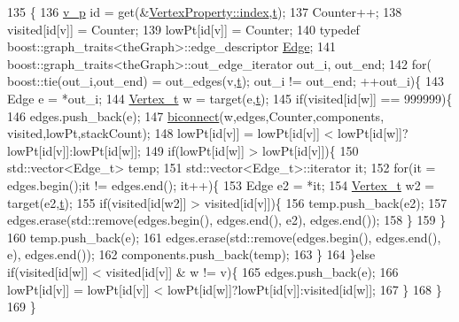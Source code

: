 \begin{DoxyCode}
135                                   \{
136     \hyperlink{utilities_8h_a3f4959b3d837fa6351a9414c79280286}{v\_p} \textcolor{keywordtype}{id} = \textcolor{keyword}{get}(&\hyperlink{struct_utility_structs_1_1_vertex_property_a636cb729438e999aa3d9a17ac39d8641}{VertexProperty::index},\hyperlink{class_tarjan_a54b0703f885a3514ea0bf4cdbc7fdaad}{t});
137     Counter++;
138     visited[\textcolor{keywordtype}{id}[v]] = Counter;
139     lowPt[\textcolor{keywordtype}{id}[v]] = Counter;
140     \textcolor{keyword}{typedef} boost::graph\_traits<theGraph>::edge\_descriptor \hyperlink{class_graph_component_aa7517b2af08aa717324076a645c73fe6}{Edge};
141     boost::graph\_traits<theGraph>::out\_edge\_iterator out\_i, out\_end;
142     \textcolor{keywordflow}{for}( boost::tie(out\_i,out\_end) = out\_edges(v,\hyperlink{class_tarjan_a54b0703f885a3514ea0bf4cdbc7fdaad}{t}); out\_i != out\_end; ++out\_i)\{
143         Edge e = *out\_i;
144         \hyperlink{utilities_8h_a344cd987714d06997f0becda3c96d6e2}{Vertex\_t} w = target(e,\hyperlink{class_tarjan_a54b0703f885a3514ea0bf4cdbc7fdaad}{t});
145         \textcolor{keywordflow}{if}(visited[\textcolor{keywordtype}{id}[w]] == 999999)\{
146             edges.push\_back(e);
147             \hyperlink{class_tarjan_a52573be5a4930ad84f3807bc49f42026}{biconnect}(w,edges,Counter,components, visited,lowPt,stackCount);
148             lowPt[\textcolor{keywordtype}{id}[v]] = lowPt[\textcolor{keywordtype}{id}[v]] < lowPt[\textcolor{keywordtype}{id}[w]]?lowPt[\textcolor{keywordtype}{id}[v]]:lowPt[\textcolor{keywordtype}{id}[w]];
149             \textcolor{keywordflow}{if}(lowPt[\textcolor{keywordtype}{id}[w]] > lowPt[\textcolor{keywordtype}{id}[v]])\{
150                 std::vector<Edge\_t> temp;
151                 std::vector<Edge\_t>::iterator it;
152                 \textcolor{keywordflow}{for}(it = edges.begin();it != edges.end(); it++)\{
153                     Edge e2 = *it;
154                     \hyperlink{utilities_8h_a344cd987714d06997f0becda3c96d6e2}{Vertex\_t} w2 = target(e2,\hyperlink{class_tarjan_a54b0703f885a3514ea0bf4cdbc7fdaad}{t});
155                     \textcolor{keywordflow}{if}(visited[\textcolor{keywordtype}{id}[w2]] > visited[\textcolor{keywordtype}{id}[v]])\{
156                         temp.push\_back(e2);
157                         edges.erase(std::remove(edges.begin(), edges.end(), e2), edges.end());
158                     \}
159                 \}
160                 temp.push\_back(e);
161                 edges.erase(std::remove(edges.begin(), edges.end(), e), edges.end());
162                 components.push\_back(temp);
163             \}
164         \}\textcolor{keywordflow}{else} \textcolor{keywordflow}{if}(visited[\textcolor{keywordtype}{id}[w]] < visited[\textcolor{keywordtype}{id}[v]] & w != v)\{
165             edges.push\_back(e);
166             lowPt[\textcolor{keywordtype}{id}[v]] = lowPt[\textcolor{keywordtype}{id}[v]] < lowPt[\textcolor{keywordtype}{id}[w]]?lowPt[\textcolor{keywordtype}{id}[v]]:visited[\textcolor{keywordtype}{id}[w]];
167         \}
168     \}
169 \}
\end{DoxyCode}
